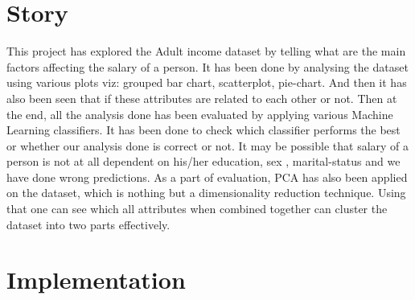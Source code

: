 \documentclass{article}
\begin{document}
\section*{Story}  

This project has explored the Adult income dataset by telling what are the main factors affecting the salary of a person. It has been done by analysing the dataset using various plots viz: grouped bar chart, scatterplot, pie-chart.
And then it has also been seen that if these attributes are related to each other or not. Then at the end, all the analysis done has been evaluated by applying various Machine Learning classifiers. It has been done to check which classifier performs the best or whether our analysis done is correct or not. It may be possible that salary of a person is not at all dependent on his/her education, sex , marital-status and we have done wrong predictions. As a part of evaluation, PCA has also been applied on the dataset, which is nothing but a dimensionality reduction technique. Using that one can see which all attributes when combined together can cluster the dataset into two parts effectively.

\section*{Implementation}  
\end{document}

